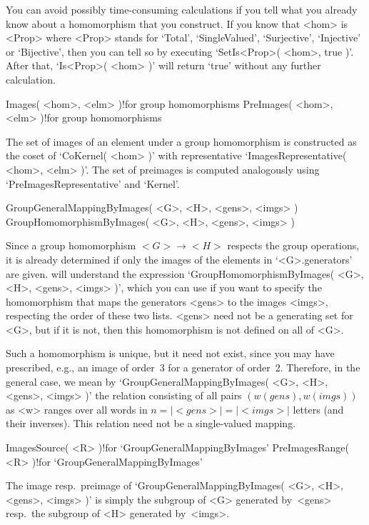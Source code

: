 You  can  avoid possibly time-consuming  calculations  if you tell {\GAP}
what you already  know  about a  homomorphism that you  construct. If you
know   that   <hom> is    <Prop>    where  <Prop>  stands   for  `Total',
`SingleValued', `Surjective',  `Injective'  or `Bijective', then  you can
tell {\GAP}  so by  executing `SetIs<Prop>( <hom>,   true )'. After that,
`Is<Prop>( <hom> )' will return `true' without any further calculation.

\>Images( <hom>, <elm> )!{for group homomorphisms}
\>PreImages( <hom>, <elm> )!{for group homomorphisms}

The set of images of an element under a group homomorphism is constructed
as  the     coset    of  `CoKernel( <hom>     )'      with representative
`ImagesRepresentative( <hom>, <elm> )'. The  set of preimages is computed
analogously using `PreImagesRepresentative' and `Kernel'.

\stars

\>GroupGeneralMappingByImages( <G>, <H>, <gens>, <imgs> )
\>GroupHomomorphismByImages( <G>, <H>, <gens>, <imgs> )

Since a group homomorphism $<G>\to <H>$ respects the group operations, it
is   already determined   if   only the    images of    the  elements  in
`<G>.generators'  are given.    {\GAP}  will  understand  the  expression
`GroupHomomorphismByImages(  <G>, <H>, <gens>,   <imgs> )', which you can
use if  you  want to specify  the homomorphism  that maps  the generators
<gens> to the  images <imgs>, respecting  the  order of these  two lists.
<gens> need not be a generating set for <G>, but if  it is not, then this
homomorphism is not defined on all of <G>.

Such a homomorphism is unique, but it need not  exist, since you may have
prescribed,  e.g., an  image of    order~3  for a generator  of  order~2.
Therefore, in the  general case, we mean by `GroupGeneralMappingByImages(
<G>,   <H>, <gens>,  <imgs>   )' the  relation   consisting of  all pairs
$(w(gens),      w(imgs))$   as   <w>     ranges   over    all    words in
$n=|<gens>|=|<imgs>|$  letters (and  their  inverses). This relation need
not be a single-valued mapping.

\>ImagesSource( <R> )!{for `GroupGeneralMappingByImages'}
\>PreImagesRange( <R> )!{for `GroupGeneralMappingByImages'}

The   image resp.~preimage   of  `GroupGeneralMappingByImages(  <G>, <H>,
<gens>, <imgs> )' is  simply   the subgroup  of <G>  generated  by~<gens>
resp.~the subgroup of <H> generated by~<imgs>.

